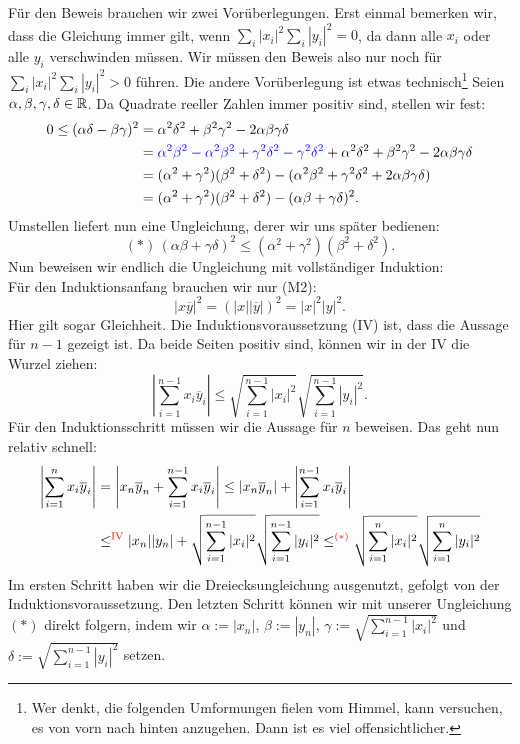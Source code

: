 \begin{beweis}
Für den Beweis brauchen wir zwei Vorüberlegungen. Erst einmal bemerken wir, dass die Gleichung immer gilt, wenn $\sum_i |x_i|^2 \sum_i|y_i|^2 = 0$, da dann alle $x_i$ oder alle $y_i$ verschwinden müssen. Wir müssen den Beweis also nur noch für $\sum_i |x_i|^2 \sum_i|y_i|^2 > 0$ führen. Die andere Vorüberlegung ist etwas technisch\footnote{Wer denkt, die folgenden Umformungen fielen vom Himmel, kann versuchen, es von vorn nach hinten anzugehen. Dann ist es viel offensichtlicher.} Seien $\alpha, \beta, \gamma, \delta \in \mathbb{R}$. Da Quadrate reeller Zahlen immer positiv sind, stellen wir fest:
\begin{align*}
0 \leq (\alpha \delta- \beta \gamma)^2 &= \alpha^2\delta^2 + \beta^2 \gamma^2 -2\alpha \beta \gamma \delta\\
&= \textcolor{blue}{\alpha^2 \beta^2 - \alpha^2 \beta^2 + \gamma^2 \delta^2 - \gamma^2 \delta^2} +\alpha^2\delta^2 + \beta^2 \gamma^2 -2\alpha \beta \gamma \delta\\
&= (\alpha^2 + \gamma^2)(\beta^2+\delta^2) - (\alpha^2 \beta^2 + \gamma^2 \delta^2 + 2 \alpha \beta \gamma \delta)\\
&= (\alpha^2 + \gamma^2)(\beta^2+\delta^2) - (\alpha \beta + \gamma \delta)^2.
\end{align*}
Umstellen liefert nun eine Ungleichung, derer wir uns später bedienen:
\begin{equation}
(\ast)\, (\alpha \beta + \gamma \delta)^2 \leq (\alpha^2 + \gamma^2)(\beta^2+\delta^2).
\end{equation}
Nun beweisen wir endlich die Ungleichung mit vollständiger Induktion:\\
Für den Induktionsanfang brauchen wir nur (M2):
\begin{equation}
|x\overline{y}|^2 = (|x||\overline{y}|)^2 = |x|^2|y|^2.
\end{equation}
Hier gilt sogar Gleichheit. Die Induktionsvoraussetzung (IV) ist, dass die Aussage für $n-1$ gezeigt ist. Da beide Seiten positiv sind, können wir in der IV die Wurzel ziehen:
\begin{equation}
\left| \sum_{i=1}^{n-1} x_i \overline{y}_i\right| \leq \sqrt{\sum_{i=1}^{n-1} |x_i|^2} \sqrt{\sum_{i=1}^{n-1} |y_i|^2}.
\end{equation}
Für den Induktionsschritt müssen wir die Aussage für $n$ beweisen. Das geht nun relativ schnell:
\begin{align*}
\left| \sum_{i=1}^n x_i \overline{y}_i\right| &= \left| x_n \overline{y}_n + \sum_{i=1}^{n-1} x_i \overline{y}_i\right|\leq |x_n \overline{y}_n| + \left| \sum_{i=1}^{n-1} x_i \overline{y}_i\right|\\
&\leq^\text{\textcolor{red}{IV}} |x_n| |y_n| + \sqrt{\sum_{i=1}^{n-1} |x_i|^2} \sqrt{\sum_{i=1}^{n-1} |y_i|^2} \leq^{\textcolor{red}{(\ast)}} \sqrt{\sum_{i=1}^{n} |x_i|^2} \sqrt{\sum_{i=1}^{n} |y_i|^2}
\end{align*}
Im ersten Schritt haben wir die Dreiecksungleichung ausgenutzt, gefolgt von der Induktionsvoraussetzung. Den letzten Schritt können wir mit unserer Ungleichung $(\ast)$ direkt folgern, indem wir $\alpha:=|x_n|$, $\beta:= |y_n|$, $\gamma:= \sqrt{\sum_{i=1}^{n-1} |x_i|^2}$ und $\delta :=\sqrt{\sum_{i=1}^{n-1} |y_i|^2}$ setzen.
\end{beweis}
